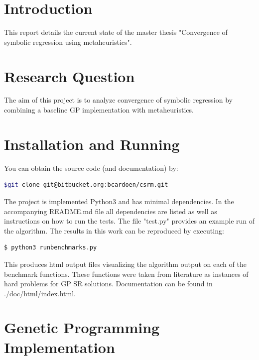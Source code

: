 \documentclass[10pt]{extarticle}
\begin{document}
\maketitle

\section{Introduction}
This report details the current state of the master thesis "Convergence of symbolic regression using metaheuristics".
\section{Research Question}
The aim of this project is to analyze convergence of symbolic regression by combining a baseline GP implementation with metaheuristics.


\section{Installation and Running}
You can obtain the source code (and documentation) by:
\begin{lstlisting}[language=Bash]
  $git clone git@bitbucket.org:bcardoen/csrm.git
\end{lstlisting}
The project is implemented Python3 and has minimal dependencies. In the accompanying README.md file all dependencies are listed as well as instructions on how to run the tests. The file "test.py" provides an example run of the algorithm. The results in this work can be reproduced by executing:
\begin{lstlisting}[language=Python]
  $ python3 runbenchmarks.py
\end{lstlisting}
This produces html output files visualizing the algorithm output on each of the benchmark functions. These functions were taken from literature as instances of hard problems for GP SR solutions.
Documentation can be found in ./doc/html/index.html.
\section{Genetic Programming Implementation}
\end{document}
